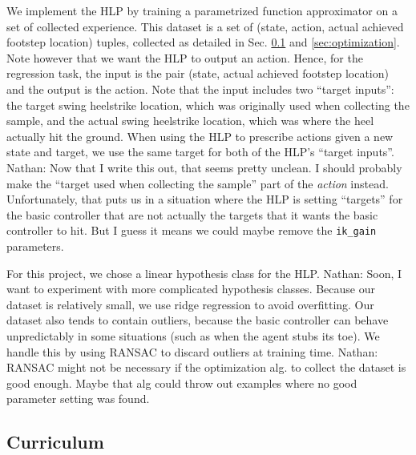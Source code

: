 \documentclass[a4paper]{article}
\newcommand{\nhatch}[1]{{\leavevmode\color{blue} Nathan: #1}}
\begin{document}
We implement the HLP by training a parametrized function approximator on a set of collected experience.
This dataset is a set of (state, action, actual achieved footstep location) tuples, collected as detailed in Sec. \ref{sec:curriculum} and \ref{sec:optimization}.
Note however that we want the HLP to output an action.
Hence, for the regression task, the input is the pair (state, actual achieved footstep location) and the output is the action.
Note that the input includes two ``target inputs'': the target swing heelstrike location, which was originally used when collecting the sample, and the actual swing heelstrike location, which was where the heel actually hit the ground.
When using the HLP to prescribe actions given a new state and target, we use the same target for both of the HLP's ``target inputs''.
\nhatch{Now that I write this out, that seems pretty unclean. I should probably make the ``target used when collecting the sample'' part of the \emph{action} instead. Unfortunately, that puts us in a situation where the HLP is setting ``targets'' for the basic controller that are not actually the targets that it wants the basic controller to hit. But I guess it means we could maybe remove the \texttt{ik\_gain} parameters.}

For this project, we chose a linear hypothesis class for the HLP.
\nhatch{Soon, I want to experiment with more complicated hypothesis classes.}
Because our dataset is relatively small, we use ridge regression to avoid overfitting.
Our dataset also tends to contain outliers, because the basic controller can behave unpredictably in some situations (such as when the agent stubs its toe).
We handle this by using RANSAC \citep{fischler1981random} to discard outliers at training time.
\nhatch{RANSAC might not be necessary if the optimization alg. to collect the dataset is good enough. Maybe that alg could throw out examples where no good parameter setting was found.}

\subsection{Curriculum} \label{sec:curriculum}
\end{document}

